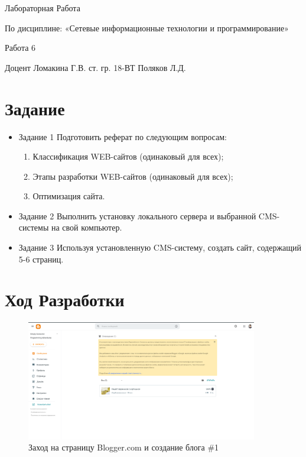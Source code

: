 \documentclass[14pt]{extarticle}
\let\oldsection\section
\renewcommand\section{\clearpage\oldsection}
\begin{document}
\unititle
{\klgtu}
{\fapu}
{\suvt}
{Лабораторная Работа}
{По дисциплине: «Сетевые информационные технологии и программирование» \par Работа 6}
{Доцент}
{Ломакина Г.В.}
{ст. гр. 18-ВТ}
{Поляков Л.Д.}

\tableofcontents

\section{Задание}

\begin{itemize}
	\item Задание 1
	Подготовить реферат по следующим  вопросам: 
	\begin{enumerate}
		\item Классификация WEB-сайтов (одинаковый для всех);
		\item Этапы разработки WEB-сайтов (одинаковый для всех);
		\item Оптимизация сайта.
	\end{enumerate}

	\item Задание 2
	 Выполнить установку локального сервера и выбранной CMS-системы на свой компьютер.
	\item Задание 3
	 Используя установленную CMS-систему, создать сайт, содержащий 5-6 страниц.
\end{itemize}

\section{Ход Разработки}

\begin{figure}[ht]
    \centering
	\includegraphics[width=0.9\textwidth, angle=0]{2021-12-12_21-10}
    \caption{Заход на страницу Blogger.com и создание блога \#1}
    \label{fig:html1}
\end{figure}
\end{document}
